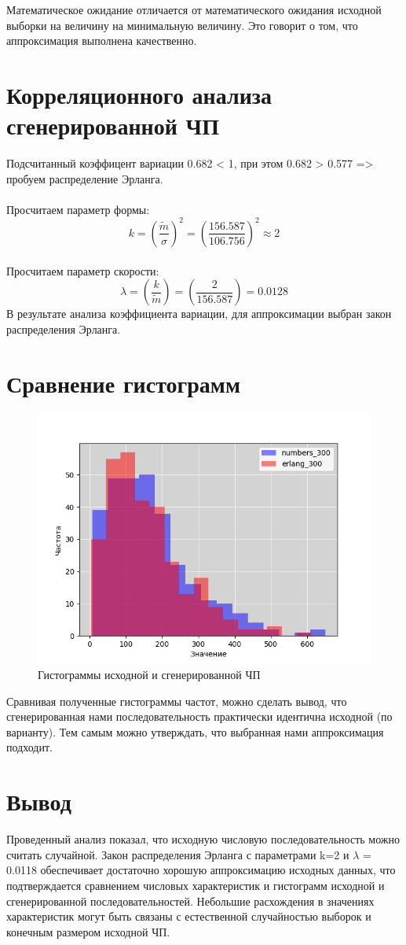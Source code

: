 \documentclass{article}
\begin{document}
Математическое ожидание отличается от математического ожидания исходной
    выборки на величину на минимальную величину. Это говорит
    о том, что аппроксимация выполнена качественно.

\section{Корреляционного анализа сгенерированной ЧП}

Подсчитанный коэффицент вариации 0.682 < 1, при этом 0.682 > 0.577 => пробуем распределение Эрланга.
\\\\
Просчитаем параметр формы:
\[k = \left(\frac{\widetilde{m}}{\sigma}\right)^2 = \left(\frac{156.587}{106.756}\right)^2 \approx 2 \]
\\
Просчитаем параметр скорости:
\[\lambda = \left(\frac{k}{\widetilde{m}}\right) = \left(\frac{2}{156.587}\right) = 0.0128 \]
В результате анализа коэффициента вариации, для аппроксимации выбран закон распределения Эрланга.

\section{Сравнение гистограмм}
\begin{figure}[H]
    \centering
    \includegraphics[width=.6\textwidth]{3}
    \caption{Гистограммы исходной и сгенерированной ЧП}
\end{figure}
Сравнивая полученные гистограммы частот, можно сделать вывод, что
сгенерированная нами последовательность практически идентична исходной (по
варианту). Тем самым можно утверждать, что выбранная нами аппроксимация
подходит.

\section*{Вывод}
Проведенный анализ показал, что исходную числовую последовательность можно считать случайной. 
Закон распределения Эрланга с параметрами k=2 и $\lambda$ = 0.0118 обеспечивает достаточно хорошую аппроксимацию исходных данных, 
что подтверждается сравнением числовых характеристик и гистограмм исходной и сгенерированной последовательностей. 
Небольшие расхождения в значениях характеристик могут быть связаны с естественной случайностью выборок и конечным размером исходной ЧП.
\end{document}
